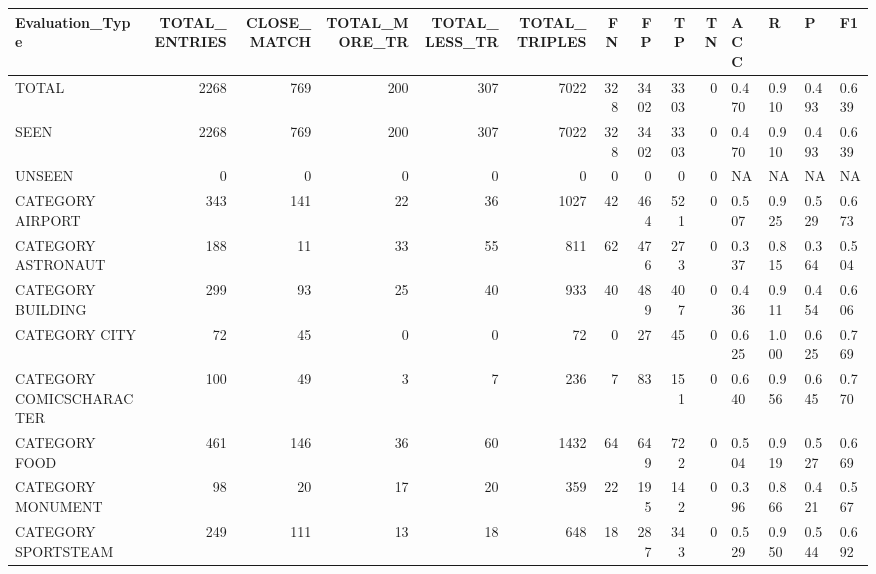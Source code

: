 \begin{tabular}{lrrrrrrrrrllll}
\hline
 Evaluation\_Type          &   TOTAL\_ENTRIES &   CLOSE\_MATCH &   TOTAL\_MORE\_TR &   TOTAL\_LESS\_TR &   TOTAL\_TRIPLES &   FN &   FP &   TP &   TN & ACC   & R     & P     & F1    \\
\hline
 TOTAL                    &            2268 &           769 &             200 &             307 &            7022 &  328 & 3402 & 3303 &    0 & 0.470 & 0.910 & 0.493 & 0.639 \\
 SEEN                     &            2268 &           769 &             200 &             307 &            7022 &  328 & 3402 & 3303 &    0 & 0.470 & 0.910 & 0.493 & 0.639 \\
 UNSEEN                   &               0 &             0 &               0 &               0 &               0 &    0 &    0 &    0 &    0 & NA    & NA    & NA    & NA    \\
 CATEGORY AIRPORT         &             343 &           141 &              22 &              36 &            1027 &   42 &  464 &  521 &    0 & 0.507 & 0.925 & 0.529 & 0.673 \\
 CATEGORY ASTRONAUT       &             188 &            11 &              33 &              55 &             811 &   62 &  476 &  273 &    0 & 0.337 & 0.815 & 0.364 & 0.504 \\
 CATEGORY BUILDING        &             299 &            93 &              25 &              40 &             933 &   40 &  489 &  407 &    0 & 0.436 & 0.911 & 0.454 & 0.606 \\
 CATEGORY CITY            &              72 &            45 &               0 &               0 &              72 &    0 &   27 &   45 &    0 & 0.625 & 1.000 & 0.625 & 0.769 \\
 CATEGORY COMICSCHARACTER &             100 &            49 &               3 &               7 &             236 &    7 &   83 &  151 &    0 & 0.640 & 0.956 & 0.645 & 0.770 \\
 CATEGORY FOOD            &             461 &           146 &              36 &              60 &            1432 &   64 &  649 &  722 &    0 & 0.504 & 0.919 & 0.527 & 0.669 \\
 CATEGORY MONUMENT        &              98 &            20 &              17 &              20 &             359 &   22 &  195 &  142 &    0 & 0.396 & 0.866 & 0.421 & 0.567 \\
 CATEGORY SPORTSTEAM      &             249 &           111 &              13 &              18 &             648 &   18 &  287 &  343 &    0 & 0.529 & 0.950 & 0.544 & 0.692 \\

\end{tabular}
